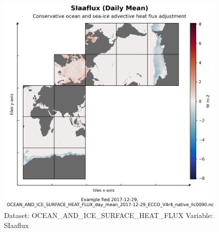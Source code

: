 \begin{figure}[H]
\centering
\includegraphics[width=\textwidth]{../images/plots/native_plots/Ocean_and_Sea-Ice_Surface_Heat_Fluxes/SIaaflux.png}
\caption{Dataset: OCEAN\_AND\_ICE\_SURFACE\_HEAT\_FLUX Variable: SIaaflux}
\label{tab:table-OCEAN_AND_ICE_SURFACE_HEAT_FLUX_SIaaflux-Plot}
\end{figure}
\pagebreak
